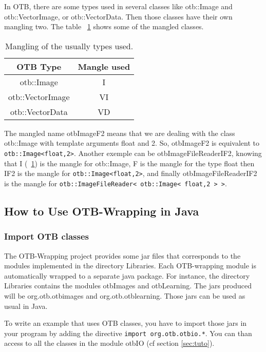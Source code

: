 In OTB, there are some types used in several classes like otb::Image and otb::VectorImage,  or otb::VectorData.
Then those classes have their own mangling two. The table ~\ref{tab:typetomangle} shows some of the mangled classes. 

\begin{table}[!htbp]
\begin{center}
\begin{tabular}{|c|c|}
\hline
OTB Type                  &  Mangle used  \\
\hline
otb::Image                 &  I         \\
otb::VectorImage           &  VI        \\
otb::VectorData            &  VD        \\
\hline 
\end{tabular}
\caption{Mangling of the usually types used.}\label{tab:typetomangle}
\end{center}
\end{table}


The mangled name otbImageF2 means that we are dealing with the class otb::Image with 
template arguments float and 2. So, otbImageF2 is equivalent to \verb|otb::Image<float,2>|. Another exemple 
can be otbImageFileReaderIF2, knowing that I (~\ref{tab:typetomangle}) is the mangle for otb::Image, F is the mangle 
for the type float then IF2 is the mangle for \verb|otb::Image<float,2>|, and finally otbImageFileReaderIF2 is the mangle for
 \verb|otb::ImageFileReader< otb::Image< float,2 > >|.


\subsection{How to Use OTB-Wrapping in Java}

\subsubsection{Import OTB classes}
The OTB-Wrapping project provides some jar files that corresponds to the modules implemented in the directory Libraries. Each OTB-wrapping 
module is automatically wrapped to a separate java package. For instance, the directory Libraries contains the modules otbImages and otbLearning. The jars produced will be org.otb.otbimages and 
org.otb.otblearning. Those jars can be used as usual in Java.

To write an example that uses OTB classes, you have to import those jars in your program by adding the directive 
\verb?import org.otb.otbio.*?. You can than access to all the classes in the module otbIO (cf section \ref{sec:tuto}).

